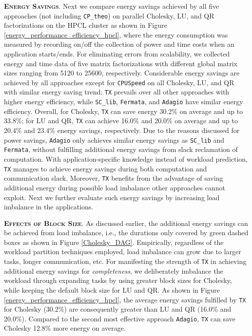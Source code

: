 \documentclass[12pt]{elsarticle}
\begin{document}
\vspace{1mm}
\noindent\textsc{\textbf{Energy Savings}}. Next we compare energy savings achieved by all five approaches (not including \texttt{CP\_theo}) on parallel Cholesky, LU, and QR factorizations on the HPCL cluster as shown in Figure \ref{energy_performance_efficiency_hpcl}, where the energy consumption was measured by recording on/off the collection of power and time costs when an application starts/ends. For eliminating errors from scalability, we collected energy and time data of five matrix factorizations with different global matrix sizes ranging from 5120 to 25600, respectively. Considerable energy savings are achieved by all approaches except for \texttt{CPUSpeed} on all Cholesky, LU, and QR with similar energy saving trend: \texttt{TX} prevails over all other approaches with higher energy efficiency, while \texttt{SC\_lib}, \texttt{Fermata}, and \texttt{Adagio} have similar energy efficiency. Overall, for Cholesky, \texttt{TX} can save energy 30.2\% on average and up to 33.8\%; for LU and QR, \texttt{TX} can achieve 16.0\% and 20.0\% on average and up to 20.4\% and 23.4\% energy savings, respectively. Due to the reasons discussed for power savings, \texttt{Adagio} only achieves similar energy savings as \texttt{SC\_lib} and \texttt{Fermata}, without fulfilling additional energy savings from slack reclamation of computation. With application-specific knowledge instead of workload prediction, \texttt{TX} manages to achieve energy savings during both computation and communication slack. Moreover, \texttt{TX} benefits from the advantage of saving additional energy during possible load imbalance other approaches cannot exploit. Next we further evaluate such energy savings by increasing load imbalance in the applications.

\vspace{1mm}
\noindent\textsc{\textbf{Effects of Block Size}}. As discussed earlier, the additional energy savings can be achieved from load imbalance, i.e., the durations only covered by green dashed boxes as shown in Figure \ref{Cholesky_DAG}. Empirically, regardless of the workload partition techniques employed, load imbalance can grow due to larger tasks, longer communication, etc. For manifesting the strength of \texttt{TX} in achieving additional energy savings for \emph{completeness}, we deliberately imbalance the workload through expanding tasks by using greater block sizes for Cholesky, while keeping the default block size for LU and QR. As shown in Figure \ref{energy_performance_efficiency_hpcl}, the average energy savings fulfilled by \texttt{TX} for Cholesky (30.2\%) are consequently greater than LU and QR (16.0\% and 20.0\%). Compared to the second most effective approach \texttt{Adagio}, \texttt{TX} can save Cholesky 12.8\% more energy on average.
\end{document}
